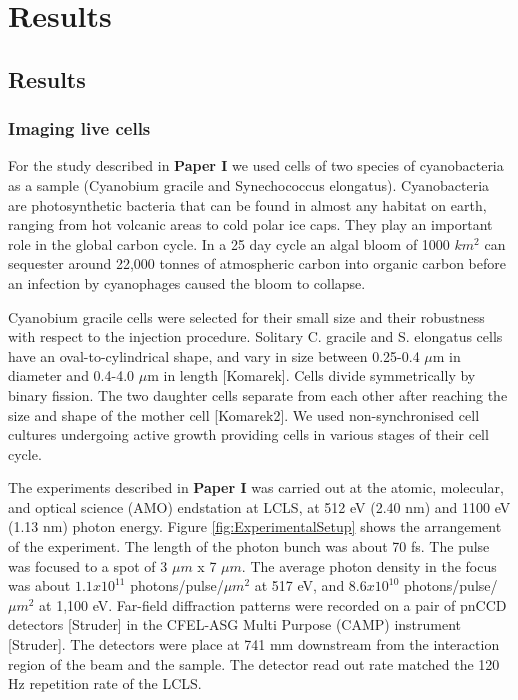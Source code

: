 \part{Results}
\chapter{Results}
\section{Imaging live cells}
For the study described in \textbf{Paper I} we used cells of two species of cyanobacteria as a sample (Cyanobium gracile and Synechococcus elongatus). Cyanobacteria are photosynthetic bacteria that can be found in almost any habitat on earth, ranging from hot volcanic areas to cold polar ice caps. They play an important role in the global carbon cycle. In a 25 day cycle an algal bloom of 1000 $km^2$ can sequester around 22,000 tonnes of atmospheric carbon into organic carbon before an infection by cyanophages caused the bloom to collapse.
 
Cyanobium gracile cells were selected for their small size and their robustness with respect to the injection procedure. Solitary C. gracile and S. elongatus cells have an oval-to-cylindrical shape, and vary in size between 0.25-0.4 $\mu$m in diameter and 0.4-4.0 $\mu$m in length [Komarek]. Cells divide symmetrically by binary fission. The two daughter cells separate from each other after reaching the size and shape of the mother cell [Komarek2]. We used non-synchronised cell cultures undergoing active growth providing cells in various stages of their cell cycle. 

The experiments described in \textbf{Paper I} was carried out at the atomic, molecular, and optical science (AMO) endstation at LCLS, at 512 eV (2.40 nm) and 1100 eV (1.13 nm) photon energy.  Figure \ref{fig:ExperimentalSetup} shows the arrangement of the experiment. The length of the photon bunch was about 70 fs. The pulse was focused to a spot of 3 $\mu m$ x 7 $\mu m$. The average photon density in the focus was about $1.1 x 10^{11}$ photons/pulse/$\mu m^2$ at 517 eV, and $8.6 x 10^{10}$ photons/pulse/$\mu m^2$ at 1,100 eV. Far-field diffraction patterns were recorded on a pair of pnCCD detectors [Struder] in the CFEL-ASG Multi Purpose (CAMP) instrument [Struder]. The detectors were place at 741 mm downstream from the interaction region of the beam and the sample. The detector read out rate matched the 120 Hz repetition rate of the LCLS. 

